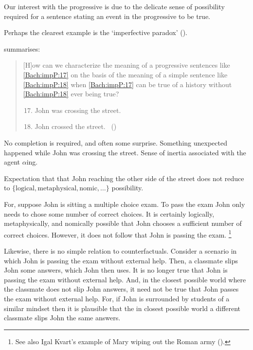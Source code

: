 \begin{note}
  Our interest with the progressive is due to the delicate sense of possibility required for a sentence stating an event in the progressive to be true.

  Perhaps the clearest example is the `imperfective paradox' (\citeyear[cf.][Ch.3.1]{Dowty:1979vq}).

  \citeauthor{Bach:1986tb} summarises:
  \begin{quote}
    [H]ow can we characterize the meaning of a progressive sentences like \ref{Bach:impP:17} on the basis of the meaning of a simple sentence like \ref{Bach:impP:18} when \ref{Bach:impP:17} can be true of a history without \ref{Bach:impP:18} ever being true?
    \begin{enumerate}[label=(\arabic*), ref=(\arabic*)]
      \setcounter{enumi}{16}
    \item
      \label{Bach:impP:17}
      John was crossing the street.
    \item
      \label{Bach:impP:18}
      John crossed the street.%
      \mbox{ }\hfill\mbox{(\citeyear[12]{Bach:1986tb})}
    \end{enumerate}
  \end{quote}

  No completion is required, and often some surprise.
  Something unexpected happened while John was crossing the street.
  Sense of inertia associated with the agent \(\alpha\)ing.

  Expectation that that John reaching the other side of the street does not reduce to \(\{\text{logical}, \text{metaphysical}, \text{nomic}, \dots\}\) possibility.

  For, suppose John is sitting a multiple choice exam.
  To pass the exam John only needs to chose some number of correct choices.
  It is certainly logically, metaphysically, and nomically possible that John chooses a sufficient number of correct choices.
  However, it does not follow that John is passing the exam.%
  \footnote{
    See also Igal Kvart's example of Mary wiping out the Roman army (\cite[18]{Landman:1992wh}).
  }

  Likewise, there is no simple relation to counterfactuals.
  Consider a scenario in which John is passing the exam without external help.
  Then, a classmate slips John some answers, which John then uses.
  It is no longer true that John is passing the exam without external help.
  And, in the closest possible world where the classmate does not slip John answers, it need not be true that John passes the exam without external help.
  For, if John is surrounded by students of a similar mindset then it is plausible that the in closest possible world a different classmate slips John the same answers.
\end{note}

